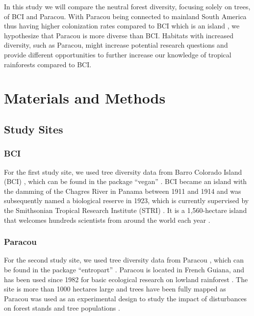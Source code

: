 \documentclass[fleqn,10pt]{ArtEcoFoG} %
\begin{document}
In this study we will compare the neutral forest diversity, focusing
solely on trees, of BCI and Paracou. With Paracou being connected to
mainland South America thus having higher colonization rates compared to
BCI which is an island \citep{BRV:BRV510}, we hypothesize that Paracou
is more diverse than BCI. Habitats with increased diversity, such as
Paracou, might increase potential research questions and provide
different opportunities to further increase our knowledge of tropical
rainforests compared to BCI.

\section{Materials and Methods}\label{materials-and-methods}

\subsection{Study Sites}\label{study-sites}

\subsubsection{BCI}\label{bci}

For the first study site, we used tree diversity data from Barro
Colorado Island (BCI) \citep{croat1978flora}, which can be found in the
package ``vegan'' \citep{oksanen2010vegan}. BCI became an island with
the damming of the Chagres River in Panama between 1911 and 1914 and was
subsequently named a biological reserve in 1923, which is currently
supervised by the Smithsonian Tropical Research Institute (STRI)
\citep{croat1978flora, leigh1999tropical}. It is a 1,560-hectare island
that welcomes hundreds scientists from around the world each year
\citep{croat1978flora}.

\subsubsection{Paracou}\label{paracou}

For the second study site, we used tree diversity data from Paracou
\citep{Degen2006}, which can be found in the package ``entropart''
\citep{Marcon2014c}. Paracou is located in French Guiana, and has been
used since 1982 for basic ecological research on lowland rainforest
\citep{Gourlet-Fleury2004}. The site is more than 1000 hectares large
and trees have been fully mapped as Paracou was used as an experimental
design to study the impact of disturbances on forest stands and tree
populations \citep{Gourlet-Fleury2004}.
\end{document}
